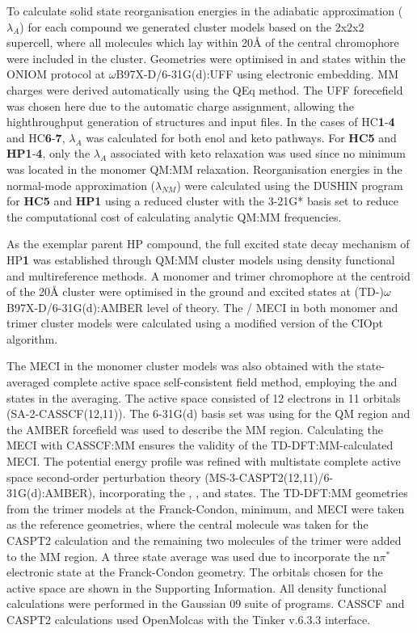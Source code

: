 To calculate solid state reorganisation energies in the adiabatic approximation ($\lambda_{A}$) for each compound we generated cluster models based on the 2x2x2 supercell, where all molecules which lay within 20{\AA} of the central chromophore were included in the cluster. Geometries were optimised in \sone{} and \szero{} states within the ONIOM protocol at $\omega$B97X-D/6-31G(d):UFF using electronic embedding. MM charges were derived automatically using the QEq method.\cite{Rappe2007} The UFF forecefield was chosen here due to the automatic charge assignment, allowing the highthroughput generation of structures and input files. In the cases of \ac{HC}\textbf{1}-\textbf{4} and \ac{HC}\textbf{6}-\textbf{7}, $\lambda_{A}$ was calculated for both enol and keto pathways. For \textbf{HC5} and \textbf{HP1}-\textbf{4}, only the $\lambda_{A}$ associated with keto relaxation was used since no \Estar{} minimum was located in the monomer QM:MM relaxation. Reorganisation energies in the normal-mode approximation ($\lambda_{NM}$) were calculated using the DUSHIN program for \textbf{HC5} and \textbf{HP1} using a reduced cluster with the 3-21G* basis set to reduce the computational cost of calculating analytic QM:MM frequencies.\cite{Reimers2001}

As the exemplar parent \ac{HP} compound, the full excited state decay mechanism of \ac{HP}\textbf{1} was established through QM:MM cluster models using density functional and multireference methods. A monomer and trimer chromophore at the centroid of the 20{\AA} cluster were optimised in the ground and excited states at (TD-)$\omega$B97X-D/6-31G(d):AMBER level of theory. The \sone/\szero{} MECI in both monomer and trimer cluster models were calculated using a modified version of the CIOpt algorithm.\cite{Levine2008} 

The MECI in the monomer cluster models was also obtained with the state-averaged complete active space self-consistent field method, employing the \szero{} and \sone{} states in the averaging. The active space consisted of 12 electrons in 11 orbitals (SA-2-CASSCF(12,11)). The 6-31G(d) basis set was using for the QM region and the AMBER forcefield was used to describe the MM region. Calculating the MECI with CASSCF:MM ensures the validity of the TD-DFT:MM-calculated MECI. The potential energy profile was refined with multistate complete active space second-order perturbation theory (MS-3-CASPT2(12,11)/6-31G(d):AMBER), incorporating the \szero{}, \sone{}, and \stwo{} states. The TD-DFT:MM geometries from the trimer models at the Franck-Condon, \sone{} minimum, and MECI were taken as the reference geometries, where the central molecule was taken for the CASPT2 calculation and the remaining two molecules of the trimer were added to the MM region.  A three state average was used due to incorporate the n$\pi^{\ast}$ \stwo{} electronic state at the Franck-Condon geometry. The orbitals chosen for the active space are shown in the Supporting Information. All density functional calculations were performed in the Gaussian 09 suite of programs.\cite{g09} CASSCF and CASPT2 calculations used OpenMolcas with the Tinker v.6.3.3 interface.\cite{Aquilante2016}

